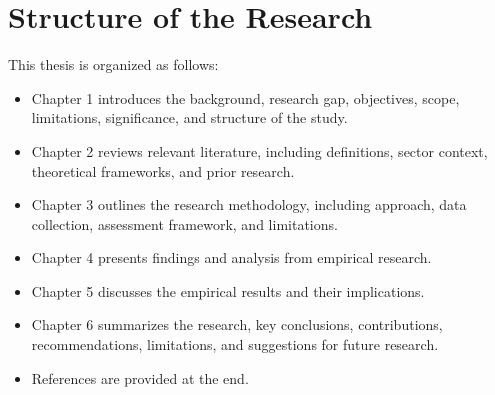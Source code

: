 \section{Structure of the Research}
This thesis is organized as follows:
\begin{itemize}
    \item Chapter 1 introduces the background, research gap, objectives, scope, limitations, significance, and structure of the study.
    \item Chapter 2 reviews relevant literature, including definitions, sector context, theoretical frameworks, and prior research.
    \item Chapter 3 outlines the research methodology, including approach, data collection, assessment framework, and limitations.
    \item Chapter 4 presents findings and analysis from empirical research.
    \item Chapter 5 discusses the empirical results and their implications.
    \item Chapter 6 summarizes the research, key conclusions, contributions, recommendations, limitations, and suggestions for future research.
    \item References are provided at the end.
\end{itemize}